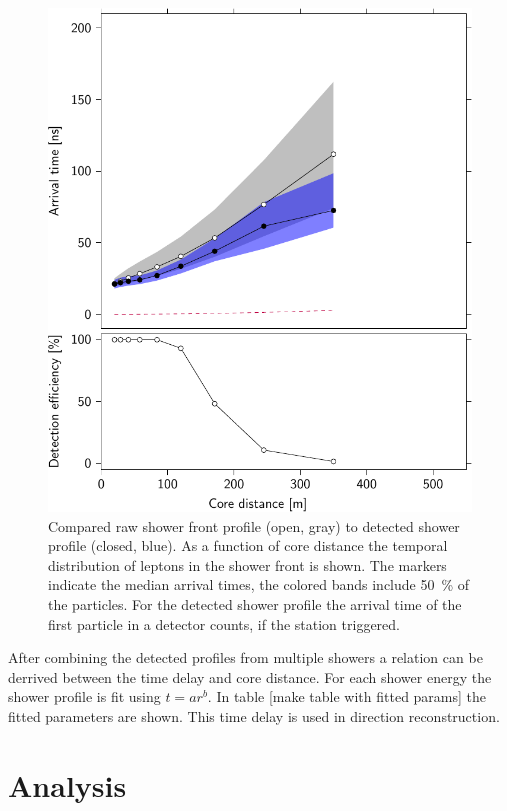 \begin{figure}
    \centering
    \includegraphics{plots/reconstructions/proton_E_16-0_Z_0-0_I_22_149042664_130233131}
    \caption{Compared raw shower front profile (open, gray) to detected shower profile (closed, blue). As a function of core distance the temporal distribution of leptons in the shower front is shown. The markers indicate the median arrival times, the colored bands include \SI{50}{\percent} of the particles. For the detected shower profile the arrival time of the first particle in a detector counts, if the station triggered.}
    \label{fig:shower_detected_time_profile}
\end{figure}

After combining the detected profiles from multiple showers a relation can be derrived between the time delay and core distance. For each shower energy the shower profile is fit using $t = a r ^ b$. In table [make table with fitted params] the fitted parameters are shown. This time delay is used in direction reconstruction.


\section{Analysis}

